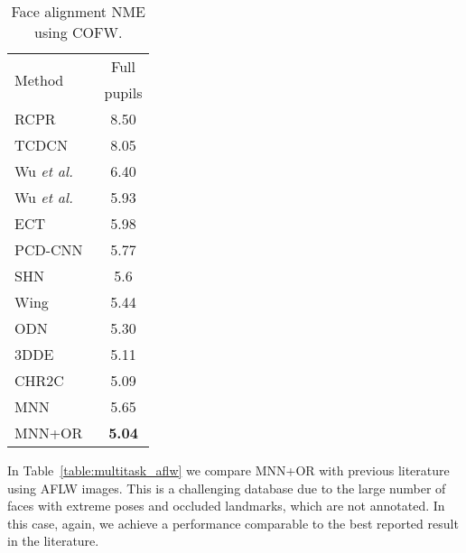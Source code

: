 \documentclass[9pt,technote,compsoc]{IEEEtran}
\newcommand{\etal}{\emph{et al.}}
\begin{document}
\begin{table}[htbp!]
\begin{center}
\begin{tabular}{l|c}
\hline
\multirow{2}{*}{Method} & Full\\
 & pupils\\
\hline
RCPR~\cite{Burgos13} & 8.50\\
TCDCN~\cite{Zhang16} & 8.05\\
Wu \etal~\cite{Wu17} & 6.40\\
Wu \etal~\cite{Wu15} & 5.93\\
ECT~\cite{Zhang18a} & 5.98\\
PCD-CNN~\cite{Kumar18a} & 5.77\\
SHN~\cite{Yang17} & 5.6\\
Wing~\cite{Feng18a} & 5.44\\
ODN~\cite{Zhu19} & 5.30\\
3DDE~\cite{Valle19b} & 5.11\\
CHR2C~\cite{Valle19a} & 5.09\\
\hline
MNN & 5.65\\
MNN+OR & \textbf{5.04}\\
\hline
\end{tabular}
\end{center}
\caption{Face alignment NME using COFW.}
\label{table:multitask_cofw}
\end{table}

In Table~\ref{table:multitask_aflw} we compare MNN+OR with previous literature using AFLW images. This is a challenging database due to the large number of faces with extreme poses and occluded landmarks, which are not annotated. 
In this case, again, we achieve a performance comparable to the best reported result in the literature.
\end{document}
